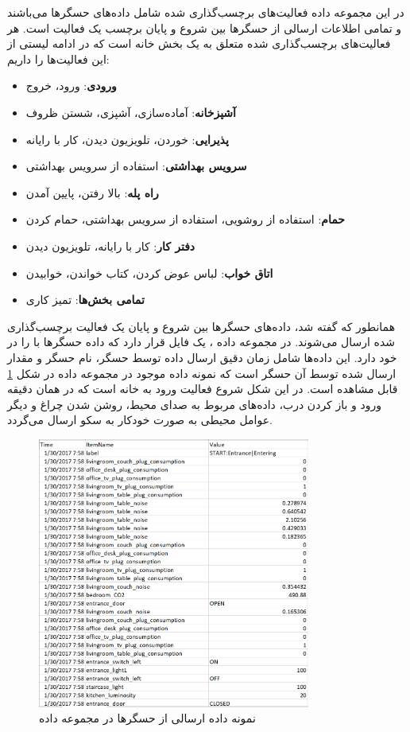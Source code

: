 در این مجموعه داده فعالیت‌های برچسب‌گذاری شده شامل داده‌های حسگرها می‌باشند و تمامی اطلاعات ارسالی از حسگرها بین شروع و پایان برچسب یک فعالیت است. هر فعالیت‌های برچسب‌گذاری شده متعلق به یک بخش خانه است که در ادامه لیستی از این فعالیت‌ها را داریم:

\begin{itemize}
\item \textbf{ورودی}: ورود، خروج
\item \textbf{آشپزخانه}: آماده‌سازی، آشپزی، شستن ظروف
\item \textbf{پذیرایی}: خوردن، تلویزیون دیدن، کار با رایانه
\item \textbf{سرویس بهداشتی}: استفاده از سرویس بهداشتی
\item \textbf{راه پله}: بالا رفتن، پایین آمدن
\item \textbf{حمام}: استفاده از روشویی، استفاده از سرویس بهداشتی، حمام کردن
\item \textbf{دفتر کار}: کار با رایانه، تلویزیون دیدن
\item \textbf{اتاق خواب}: لباس عوض کردن، کتاب خواندن، خوابیدن
\item \textbf{تمامی بخش‌ها}: تمیز کاری
\end{itemize}

همانطور که گفته شد، داده‌های حسگرها بین شروع و پایان یک فعالیت برچسب‌گذاری شده ارسال می‌شوند. در مجموعه داده ، یک فایل  قرار دارد که داده حسگرها با را در خود دارد. این داده‌ها شامل زمان دقیق ارسال داده توسط حسگر، نام حسگر و مقدار ارسال شده توسط آن حسگر است که نمونه داده‌ موجود در مجموعه داده در شکل \ref{fig:fO4H3} قابل مشاهده است. در این شکل شروع فعالیت ورود به خانه است که در همان دقیقه ورود و باز کردن درب، داده‌های مربوط به صدای محیط، روشن شدن چراغ و دیگر عوامل محیطی به صورت خودکار به سکو ارسال می‌گردد.

\begin{figure}[H]
\centerline{\includegraphics[width=0.8\textwidth]{figs/fO4H3.png}}
\caption{نمونه داده ارسالی از حسگرها در مجموعه داده }
\label{fig:fO4H3}
\end{figure}

